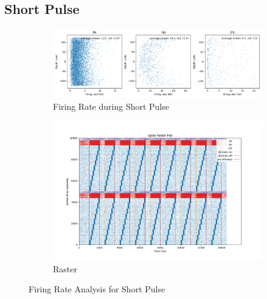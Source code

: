 \documentclass[12pt, letterpaper]{article}
\begin{document}
\subsection*{Short Pulse}

\begin{figure}[H]
  \centering
  \begin{subfigure}{\textwidth}
    \centering
    \includegraphics[width=\textwidth]{output/short-spikes}
    \caption{Firing Rate during Short Pulse}
    \label{fig:short-spikes}
  \end{subfigure}
  \begin{subfigure}{\textwidth}
    \centering
    \includegraphics[width=\textwidth]{output/short-raster}
    \caption{Raster}
    \label{fig:short-raster}
  \end{subfigure}
  \caption{Firing Rate Analysis for Short Pulse}
\end{figure}
\end{document}
